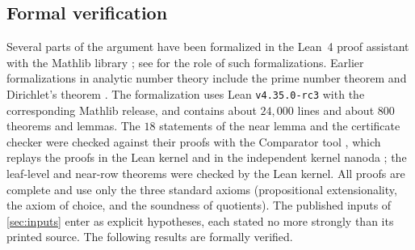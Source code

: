 \documentclass[11pt]{amsart}
\numberwithin{equation}{section}
\theoremstyle{plain}
\theoremstyle{definition}
\theoremstyle{remark}
\newcommand{\1}{\mathbf{1}}
\begin{document}
\subsection{Formal verification}\label{subsec:lean}
Several parts of the argument have been formalized in the Lean~4 proof assistant
\cite{deMouraUllrich2021lean} with the Mathlib library \cite{mathlib2020lean}; see
\cite{Avigad2024mathematics} for the role of such formalizations. Earlier formalizations in
analytic number theory include the prime number theorem
\cite{AvigadDonnellyGrayRaff2007formally,Harrison2009formalizing,KontorovichTao2024pnt} and
Dirichlet's theorem \cite{Stoll2024dirichlet}. The formalization uses Lean \texttt{v4.35.0-rc3} with
the corresponding Mathlib release, and contains about $24{,}000$ lines and about $800$ theorems and
lemmas. The $18$ statements of the near lemma and the certificate checker were checked against
their proofs with the Comparator tool \cite{LeanFRO2025comparator}, which replays the proofs in the
Lean kernel and in the independent kernel nanoda \cite{Bailey2020nanoda}; the leaf-level and near-row
theorems were checked by the Lean kernel. All proofs are complete and use only the
three standard axioms (propositional extensionality, the axiom of choice, and the soundness of
quotients). The published inputs of \cref{sec:inputs} enter as explicit hypotheses, each stated
no more strongly than its printed source. The following results are formally verified.
\end{document}
